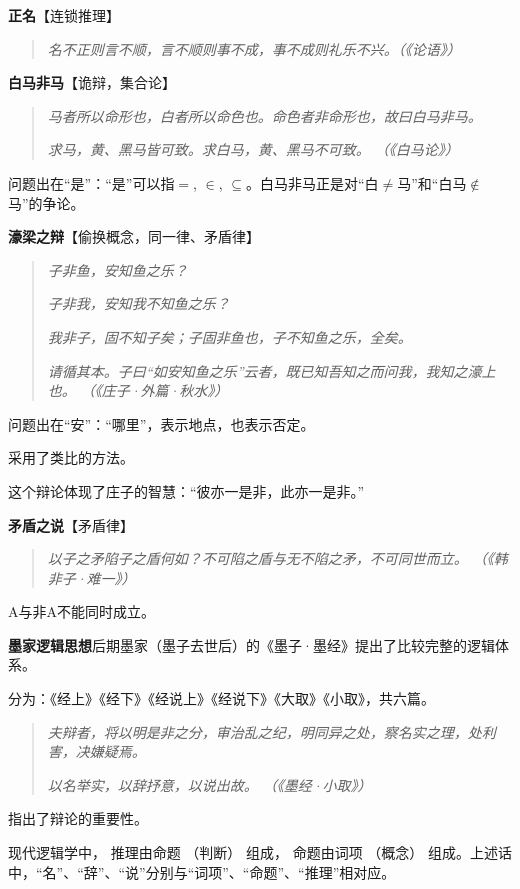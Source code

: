 \documentclass[12pt,onecolumn,a4paper]{book}
\numberwithin{table}{subsection}
\numberwithin{equation}{subsection}
\begin{document}
\textbf{正名}【连锁推理】

\begin{quotation}
    \emph{名不正则言不顺，言不顺则事不成，事不成则礼乐不兴。（《论语》）}
\end{quotation}

\textbf{白马非马}【诡辩，集合论】

\begin{quotation}
    \emph{马者所以命形也，白者所以命色也。命色者非命形也，故曰白马非马。}

    \emph{求马，黄、黑马皆可致。求白马，黄、黑马不可致。 （《白马论》）}
\end{quotation}

问题出在“是”：“是”可以指$=$, $\in$, $\subseteq$。白马非马正是对“白$\neq$马”和“白马$\notin$马”的争论。

\textbf{濠梁之辩}【偷换概念，同一律、矛盾律】

\begin{quotation}
    \emph{子非鱼，安知鱼之乐？}

    \emph{子非我，安知我不知鱼之乐？}

    \emph{我非子，固不知子矣；子固非鱼也，子不知鱼之乐，全矣。}

    \emph{请循其本。子曰“如安知鱼之乐”云者，既已知吾知之而问我，我知之濠上也。 （《庄子·外篇·秋水》）}
\end{quotation}
问题出在“安”：“哪里”，表示地点，也表示否定。

采用了类比的方法。

这个辩论体现了庄子的智慧：“彼亦一是非，此亦一是非。”

\textbf{矛盾之说}【矛盾律】

\begin{quotation}
    \emph{以子之矛陷子之盾何如？不可陷之盾与无不陷之矛，不可同世而立。 （《韩非子·难一》）}
\end{quotation}
A与非A不能同时成立。

\textbf{墨家逻辑思想}后期墨家（墨子去世后）的《墨子·墨经》提出了比较完整的逻辑体系。

分为：《经上》《经下》《经说上》《经说下》《大取》《小取》，共六篇。

\begin{quotation}
    \emph{夫辩者，将以明是非之分，审治乱之纪，明同异之处，察名实之理，处利害，决嫌疑焉。}

    \emph{以名举实，以辞抒意，以说出故。 （《墨经·小取》）}
\end{quotation}
指出了辩论的重要性。

现代逻辑学中， 推理由命题 （判断） 组成， 命题由词项 （概念） 组成。上述话中，“名”、“辞”、“说”分别与“词项”、“命题”、“推理”相对应。
\end{document}
